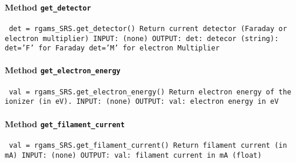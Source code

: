 \paragraph{Method \texttt{get_detector}}
\vspace{1ex}
\texttt{\newline
det = rgams_SRS.get_detector()\newline
\newline
Return current detector (Faraday or electron multiplier)\newline
\newline
INPUT:\newline
(none)\newline
\newline
OUTPUT:\newline
det: detecor (string):\newline
det='F' for Faraday\newline
det='M' for electron Multiplier\newline
\newline
}

\paragraph{Method \texttt{get_electron_energy}}
\vspace{1ex}
\texttt{\newline
val = rgams_SRS.get_electron_energy()\newline
\newline
Return electron energy of the ionizer (in eV).\newline
\newline
INPUT:\newline
(none)\newline
\newline
OUTPUT:\newline
val: electron energy in eV\newline
\newline
}

\paragraph{Method \texttt{get_filament_current}}
\vspace{1ex}
\texttt{\newline
val = rgams_SRS.get_filament_current()\newline
\newline
Return filament current (in mA)\newline
\newline
INPUT:\newline
(none)\newline
\newline
OUTPUT:\newline
val: filament current in mA (float)\newline
\newline
}

